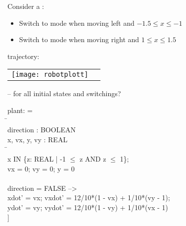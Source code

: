 \documentclass{seminar}
\begin{document}
\begin{slide}

Consider a {}:
\begin{itemize}
\item Switch to {} mode when moving left and $-1.5 \leq x \leq -1$
\item Switch to {} mode when moving right and $1 \leq x \leq 1.5$
\end{itemize}

{} trajectory:

\begin{center}
\begin{tabular}{c@{\qquad}c}
\texttt{[image: robotplott]}
&
\end{tabular}
\end{center}

{} -- 
for all initial states and switchings?


\end{slide}
\begin{slide}

\begin{small}
\begin{tt}
\begin{tabbing}
 plant: {} =
\\ 
 {}\={}
\\ \>
 {} direction : BOOLEAN  %
\\ \>
 {} x, vx, y, vy : REAL
\\ \>
 {}\={}
\\ \> \>
  x IN \{z: REAL | -1 $\leq$ z AND z $\leq$ 1\};
\\ \> \>
  vx = 0; vy = 0; y = 0
\\ \>
 {}
\\ \>
 [  di\=rection = TRUE  -->
\\ \> \>
     xdot' = vx;  vxdot' = -12/10*(1 + vx) + 1/10*(vy - 1);
\\ \> \>
     ydot' = vy;  vydot' = 12/10*(1 - vy) + 1/10*(vx + 1)
\\ \> 
 [] direction = FALSE  -->
\\ \> \>
     xdot' = vx;  vxdot' = 12/10*(1 - vx) + 1/10*(vy - 1);
\\ \> \>
     ydot' = vy;  vydot' = 12/10*(1 - vy) + 1/10*(vx - 1)
\\ \>
 ]
\\
 {}
\end{tabbing}
\end{tt}
\end{small}

\end{slide}
\end{document}
